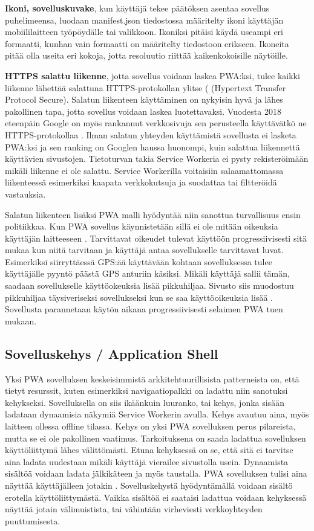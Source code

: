 \documentclass{tktltiki}
\begin{document}
\textbf{Ikoni, sovelluskuvake}, kun käyttäjä tekee päätöksen asentaa sovellus puhelimeensa, luodaan manifest.json tiedostossa määritelty ikoni käyttäjän mobiililaitteen työpöydälle tai valikkoon. Ikoniksi pitäisi käydä useampi eri formaatti, kunhan vain formaatti on määritelty tiedostoon erikseen. Ikoneita pitää olla useita eri kokoja, jotta resoluutio riittää kaikenkokoisille näytöille.

\textbf{HTTPS salattu liikenne}, jotta sovellus voidaan laskea PWA:ksi, tulee kaikki liikenne lähettää salattuna HTTPS-protokollan ylitse ( (Hypertext Transfer Protocol Secure). Salatun liikenteen käyttäminen on nykyisin hyvä ja lähes pakollinen tapa, jotta sovellus voidaan laskea luotettavaksi. Vuodesta 2018 eteenpäin Google on myös rankannut verkkosivuja sen perusteella käyttävätkö ne HTTPS-protokollaa \cite{Eisworth}. Ilman salatun yhteyden käyttämistä sovellusta ei lasketa PWA:ksi ja sen ranking on Googlen haussa huonompi, kuin salattua liikennettä käyttävien sivustojen. Tietoturvan takia Service Workeria ei pysty rekisteröimään mikäli liikenne ei ole salattu. \cite{biorn2017progressive} Service Workerilla voitaisiin salaamattomassa liikenteessä esimerkiksi kaapata verkkokutsuja ja suodattaa tai filtteröidä vastauksia.

Salatun liikenteen lisäksi PWA malli hyödyntää niin sanottua turvallisuus ensin politiikkaa. Kun PWA sovellus käynnistetään sillä ei ole mitään oikeuksia käyttäjän laitteeseen \cite{8287006}. Tarvittavat oikeudet tulevat käyttöön progressiivisesti sitä mukaa kun niitä tarvitaan ja käyttäjä antaa sovellukselle tarvittavat luvat. Esimerkiksi siirryttäessä GPS:ää käyttävään kohtaan sovelluksessa tulee käyttäjälle pyyntö päästä GPS anturiin käsiksi. Mikäli käyttäjä sallii tämän, saadaan sovellukselle käyttöokeuksia lisää pikkuhiljaa. Sivusto siis muodostuu pikkuhiljaa täysiveriseksi sovellukseksi kun se saa käyttöoikeuksia lisää \cite{von2018progressive}. Sovellusta parannetaan käytön aikana progressiivisesti selaimen PWA tuen mukaan.

\subsection{Sovelluskehys / Application Shell}

Yksi PWA sovelluksen keskeisimmistä arkkitehtuurillisista patterneista on, että tietyt resurssit, kuten esimerkiksi navigaatiopalkki on ladattu niin sanotuksi kehykseksi. \cite{8441701} Sovelluksella on siis ikäänkuin luuranko, tai kehys, jonka sisään ladataan dynaamisia näkymiä Service Workerin avulla. Kehys avautuu aina, myös laitteen ollessa offline tilassa. Kehys on yksi PWA sovelluksen perus pilareista, mutta se ei ole pakollinen vaatimus. Tarkoituksena on saada ladattua sovelluksen käyttöliittymä lähes välittömästi. Etuna kehyksessä on se, että sitä ei tarvitse aina ladata uudestaan mikäli käyttäjä vierailee sivustolla usein. Dynaamista sisältöä voidaan ladata jälkikäteen ja myös taustalla. PWA sovelluksen tulisi aina näyttää käyttäjälleen jotakin \cite{von2018progressive}. Sovelluskehystä hyödyntämällä voidaan sisältö erotella käyttöliittymästä. Vaikka sisältöä ei saataisi ladattua voidaan kehyksessä näyttää jotain välimuistista, tai vähintään virheviesti verkkoyhteyden puuttumisesta.
\end{document}
